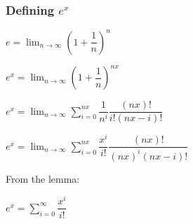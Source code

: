 \subsubsection{Defining \(e^x\)}

\(e=\lim_{n\rightarrow \infty }(1+\dfrac{1}{n})^{n}\)

\(e^x=\lim_{n\rightarrow \infty }(1+\dfrac{1}{n})^{nx}\)

\(e^x=\lim_{n\rightarrow \infty }\sum^{nx}_{i=0} \dfrac{1}{n^i} \dfrac{(nx)!}{i!(nx-i)!}\)

\(e^x=\lim_{n\rightarrow \infty }\sum^{nx}_{i=0} \dfrac{x^i}{i!} \dfrac{(nx)!}{(nx)^i(nx-i)!}\)

From the lemma:

\(e^x=\sum^{\infty }_{i=0} \dfrac{x^i}{i!}\)

